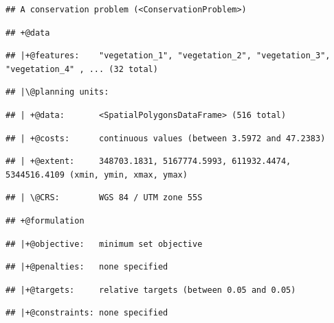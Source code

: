 \documentclass[
  12pt,
]{book}
\begin{document}
\begin{verbatim}
## A conservation problem (<ConservationProblem>)
\end{verbatim}

\begin{verbatim}
## +@data
\end{verbatim}

\begin{verbatim}
## |+@features:    "vegetation_1", "vegetation_2", "vegetation_3", "vegetation_4" , ... (32 total)
\end{verbatim}

\begin{verbatim}
## |\@planning units:
\end{verbatim}

\begin{verbatim}
## | +@data:       <SpatialPolygonsDataFrame> (516 total)
\end{verbatim}

\begin{verbatim}
## | +@costs:      continuous values (between 3.5972 and 47.2383)
\end{verbatim}

\begin{verbatim}
## | +@extent:     348703.1831, 5167774.5993, 611932.4474, 5344516.4109 (xmin, ymin, xmax, ymax)
\end{verbatim}

\begin{verbatim}
## | \@CRS:        WGS 84 / UTM zone 55S
\end{verbatim}

\begin{verbatim}
## +@formulation
\end{verbatim}

\begin{verbatim}
## |+@objective:   minimum set objective
\end{verbatim}

\begin{verbatim}
## |+@penalties:   none specified
\end{verbatim}

\begin{verbatim}
## |+@targets:     relative targets (between 0.05 and 0.05)
\end{verbatim}

\begin{verbatim}
## |+@constraints: none specified
\end{verbatim}
\end{document}
